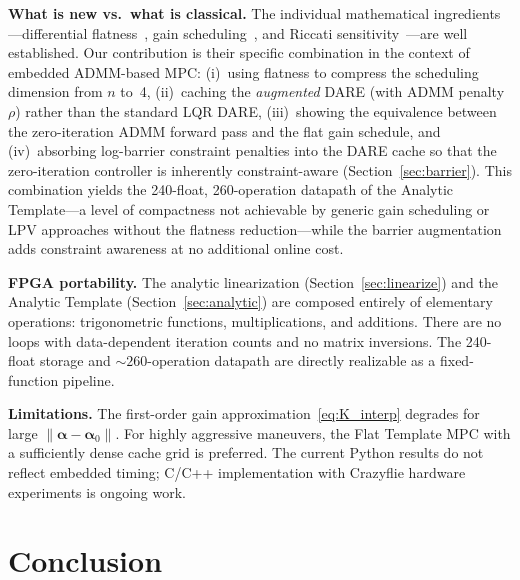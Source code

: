 \documentclass[letterpaper, 10pt, conference]{IEEEtran}
\newcommand{\balpha}{\bm{\alpha}}
\begin{document}
\textbf{What is new vs.\ what is classical.}
The individual mathematical ingredients---differential
flatness~\cite{fliess1995,mellinger2011},
gain scheduling~\cite{rugh2000},
and Riccati sensitivity~\cite{hewer1971,konstantinov1993}---are
well established.
Our contribution is their specific combination in the context
of embedded ADMM-based MPC:
(i)~using flatness to compress the scheduling dimension from
$n$ to~4,
(ii)~caching the \emph{augmented} DARE (with ADMM penalty $\rho$)
rather than the standard LQR DARE,
(iii)~showing the equivalence between the zero-iteration ADMM
forward pass and the flat gain schedule,
and (iv)~absorbing log-barrier constraint penalties into the DARE
cache so that the zero-iteration controller is inherently
constraint-aware (Section~\ref{sec:barrier}).
This combination yields the 240-float, 260-operation
datapath of the Analytic Template---a level of compactness
not achievable by generic gain scheduling or LPV approaches
without the flatness reduction---while the barrier augmentation
adds constraint awareness at no additional online cost.

\textbf{FPGA portability.}
The analytic linearization (Section~\ref{sec:linearize}) and the
Analytic Template (Section~\ref{sec:analytic}) are composed entirely
of elementary operations: trigonometric functions, multiplications,
and additions.
There are no loops with data-dependent iteration counts
and no matrix inversions.
The 240-float storage and ${\sim}260$-operation datapath
are directly realizable as a fixed-function pipeline.

\textbf{Limitations.}
The first-order gain approximation~\eqref{eq:K_interp} degrades
for large $\|\balpha - \balpha_0\|$.
For highly aggressive maneuvers, the Flat Template MPC with a
sufficiently dense cache grid is preferred.
The current Python results do not reflect embedded timing;
C/C++ implementation with Crazyflie hardware experiments
is ongoing work.

\section{Conclusion}\label{sec:conclusion}
\end{document}

